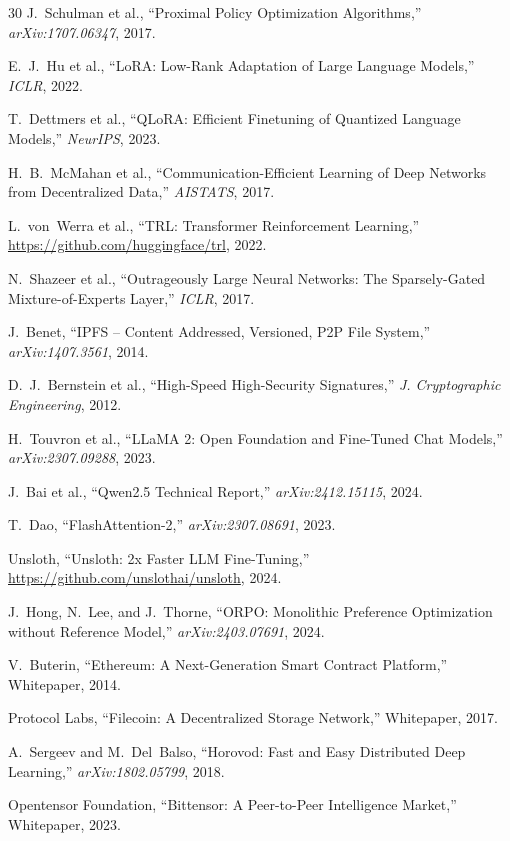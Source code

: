 \documentclass[11pt,letterpaper]{article}
\begin{document}
\begin{thebibliography}{30}
J.~Schulman et al., ``Proximal Policy Optimization Algorithms,'' \textit{arXiv:1707.06347}, 2017.

E.~J.~Hu et al., ``LoRA: Low-Rank Adaptation of Large Language Models,'' \textit{ICLR}, 2022.

T.~Dettmers et al., ``QLoRA: Efficient Finetuning of Quantized Language Models,'' \textit{NeurIPS}, 2023.

H.~B.~McMahan et al., ``Communication-Efficient Learning of Deep Networks from Decentralized Data,'' \textit{AISTATS}, 2017.

L.~von~Werra et al., ``TRL: Transformer Reinforcement Learning,'' \url{https://github.com/huggingface/trl}, 2022.

N.~Shazeer et al., ``Outrageously Large Neural Networks: The Sparsely-Gated Mixture-of-Experts Layer,'' \textit{ICLR}, 2017.

J.~Benet, ``IPFS -- Content Addressed, Versioned, P2P File System,'' \textit{arXiv:1407.3561}, 2014.

D.~J.~Bernstein et al., ``High-Speed High-Security Signatures,'' \textit{J. Cryptographic Engineering}, 2012.

H.~Touvron et al., ``LLaMA 2: Open Foundation and Fine-Tuned Chat Models,'' \textit{arXiv:2307.09288}, 2023.

J.~Bai et al., ``Qwen2.5 Technical Report,'' \textit{arXiv:2412.15115}, 2024.

T.~Dao, ``FlashAttention-2,'' \textit{arXiv:2307.08691}, 2023.

Unsloth, ``Unsloth: 2x Faster LLM Fine-Tuning,'' \url{https://github.com/unslothai/unsloth}, 2024.

J.~Hong, N.~Lee, and J.~Thorne, ``ORPO: Monolithic Preference Optimization without Reference Model,'' \textit{arXiv:2403.07691}, 2024.

V.~Buterin, ``Ethereum: A Next-Generation Smart Contract Platform,'' Whitepaper, 2014.

Protocol Labs, ``Filecoin: A Decentralized Storage Network,'' Whitepaper, 2017.

A.~Sergeev and M.~Del~Balso, ``Horovod: Fast and Easy Distributed Deep Learning,'' \textit{arXiv:1802.05799}, 2018.

Opentensor Foundation, ``Bittensor: A Peer-to-Peer Intelligence Market,'' Whitepaper, 2023.

\end{thebibliography}
\end{document}
